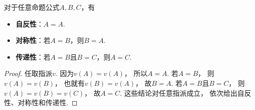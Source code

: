 \begin{theorem}
对于任意命题公式\(A,B,C\)，有\begin{itemize}
	\item {\rm\bf 自反性}：\(A = A\).
	\item {\rm\bf 对称性}：若\(A = B\)，则\(B = A\).
	\item {\rm\bf 传递性}：若\(A = B\)且\(B = C\)，则\(A = C\).
\end{itemize}
    \begin{proof}
        任取指派\(v\).
        因为\(v(A)=v(A)\)，
        所以\(A=A\).
        若\(A=B\)，
        则\(v(A)=v(B)\)，
        也就有\(v(B)=v(A)\)，
        故\(B=A\).
        若\(A=B\)且\(B=C\)，
        则\(v(A)=v(B)=v(C)\)，
        故\(A=C\).
        这些结论对任意指派成立，
        依次给出自反性、对称性和传递性.
    \end{proof}
\end{theorem}

